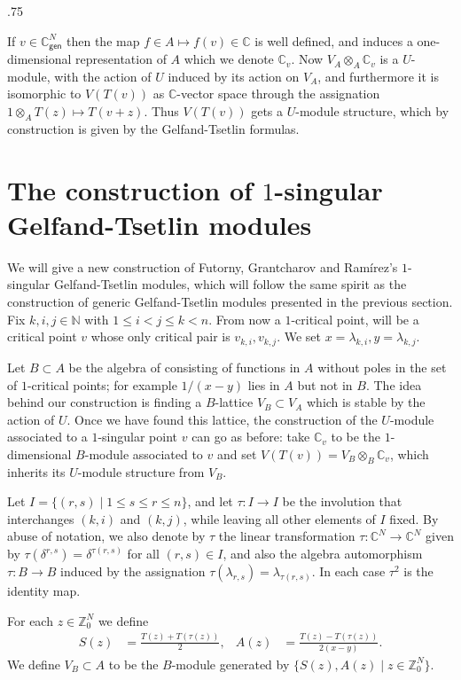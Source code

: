\documentclass[11pt,fleqn]{article}
\makeatletter
\newcounter{para}[section]
\renewenvironment{proof}[1][\textit{Proof}]{\par
  \pushQED{\qed}%
  \normalfont \topsep.75\paraskip\relax
  \trivlist
  \item[\hskip\labelsep
        \itshape
    #1\@addpunct{.}]\ignorespaces
}{%
  \popQED\endtrivlist\@endpefalse
}
\newcommand\NN{\mathbb N}
\newcommand\CC{\mathbb C}
\newcommand\ZZ{\mathbb Z}
\newcommand\ot{\otimes}
\renewcommand\to{\longrightarrow}
\newcommand\gen{\mathsf{gen}}
\makeatother
\begin{document}
\begin{proof}[Proof of Theorem \ref{T:generic-GT}]
\label{GT-generic-proof}
If $v \in \CC_\gen^N$ then the map $f \in A \mapsto f(v) \in \CC$ is well
defined, and induces a one-dimensional representation of $A$ which we denote
$\CC_v$. Now $V_A \ot_A \CC_v$ is a $U$-module, with the action of $U$ induced
by its action on $V_A$, and furthermore it is isomorphic to $V(T(v))$ as 
$\CC$-vector space through the assignation $1 \ot_A T(z) \mapsto T(v+z)$. 
Thus $V(T(v))$ gets a $U$-module structure, which by construction is given by
the Gelfand-Tsetlin formulas. 
\end{proof}

\section{The construction of $1$-singular Gelfand-Tsetlin modules}
We will give a new construction of Futorny, Grantcharov and Ramírez's 
$1$-singular Gelfand-Tsetlin modules, which will follow the same spirit as the 
construction of generic Gelfand-Tsetlin modules presented in the previous 
section. Fix $k,i,j \in \NN$ with $1 \leq i < j \leq k <n$. From now a 
$1$-critical point, will be a critical point $v$ whose only critical pair is 
$v_{k,i}, v_{k,j}$. We set $x = \lambda_{k,i}, y = \lambda_{k,j}$. 

Let $B \subset A$ be the algebra of consisting of functions in $A$ without 
poles in the set of $1$-critical points; for example $1/(x-y)$ lies in $A$
but not in $B$. The idea behind our construction is finding a $B$-lattice $V_B 
\subset V_A$ which is stable by the action of $U$. Once we have found this 
lattice, the construction of the $U$-module associated to a $1$-singular point 
$v$ can go as before: take $\CC_v$ to be the $1$-dimensional $B$-module 
associated to $v$ and set $V(T(v)) = V_B \ot_B \CC_v$, which inherits its 
$U$-module structure from $V_B$.

Let $I = \{(r,s) \mid 1 \leq s \leq r \leq n\}$, and let $\tau: I \to I$ be 
the involution that interchanges $(k,i)$ and $(k,j)$, while leaving all other
elements of $I$ fixed. By abuse of notation, we also denote by $\tau$ the 
linear transformation $\tau: \CC^N \to \CC^N$ given by $\tau(\delta^{r,s}) =
\delta^{\tau(r,s)}$ for all $(r,s) \in I$, and also the algebra automorphism
$\tau: B \to B$ induced by the assignation $\tau(\lambda_{r,s}) = 
\lambda_{\tau(r,s)}$. In each case $\tau^2$ is the identity map.

\begin{Definition}
\label{D:V-B}
For each $z \in \ZZ^N_0$ we define 
\begin{align*}
S(z)
	&= \frac{T(z) + T(\tau(z))}{2},
&A(z)
	&= \frac{T(z) - T(\tau(z))}{2(x-y)}.
\end{align*}
We define $V_B \subset A$ to be the $B$-module generated by $\{S(z), A(z) \mid
z \in \ZZ^N_0\}$.
\end{Definition}
\end{document}
